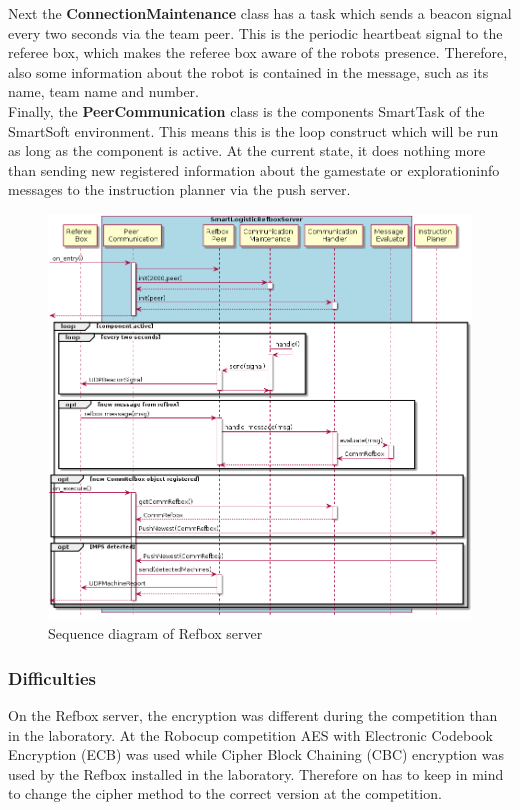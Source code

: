 Next the \textbf{ConnectionMaintenance} class has a task which sends a beacon signal every two seconds via the team peer. This is the periodic heartbeat signal to the referee box, which makes the referee box aware of the robots presence. Therefore, also some information about the robot is contained in the message, such as its name, team name and number.\\

Finally, the \textbf{PeerCommunication} class is the components SmartTask of the SmartSoft environment. This means this is the loop construct which will be run as long as the component is active. At the current state, it does nothing more than sending new registered information about the gamestate or explorationinfo messages to the instruction planner via the push server.\\

\begin{figure}[!h]
\centering
\includegraphics[width=\linewidth]{pic/sequence_diagram_RefboxServer.png}
\caption{Sequence diagram of Refbox server \cite{BOK}}
\label{fig:sequenceDiagramRefboxServer}
\end{figure}


\subsubsection{Difficulties}

On the Refbox server, the encryption was different during the competition than in the laboratory. At the Robocup competition AES with Electronic Codebook Encryption (ECB) was used while Cipher Block Chaining (CBC) encryption was used by the Refbox installed in the laboratory. Therefore on has to keep in mind to change the cipher method to the correct version at the competition. \\